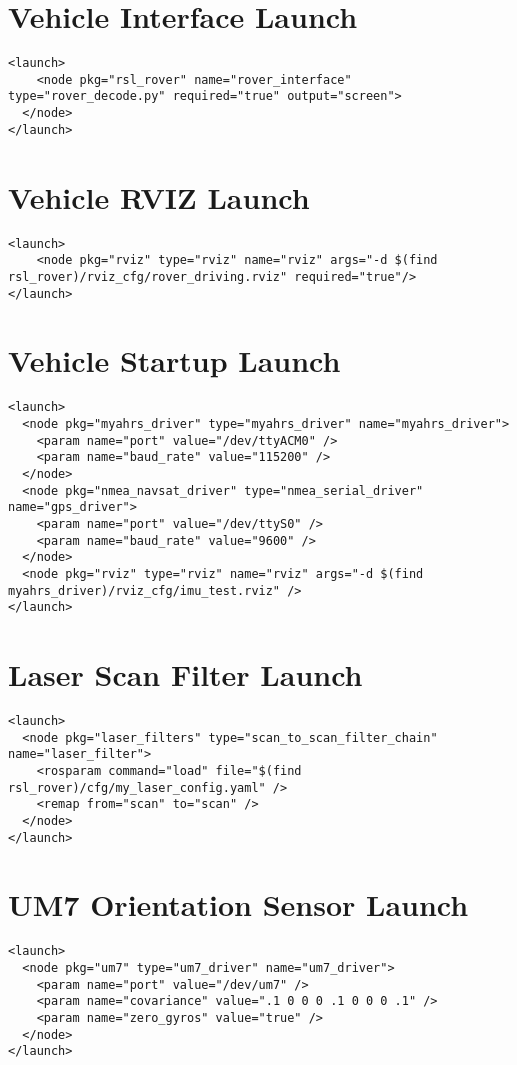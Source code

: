 \section*{Vehicle Interface Launch}
\begin{lstlisting}[breaklines=true,basicstyle=\tiny]
<launch>
	<node pkg="rsl_rover" name="rover_interface" type="rover_decode.py" required="true" output="screen">
  </node>
</launch>
\end{lstlisting}


\section*{Vehicle RVIZ Launch}
\begin{lstlisting}[breaklines=true,basicstyle=\tiny]
<launch>
	<node pkg="rviz" type="rviz" name="rviz" args="-d $(find rsl_rover)/rviz_cfg/rover_driving.rviz" required="true"/>
</launch>
\end{lstlisting}


\section*{Vehicle Startup Launch}
\begin{lstlisting}[breaklines=true,basicstyle=\tiny]
<launch>
  <node pkg="myahrs_driver" type="myahrs_driver" name="myahrs_driver">
    <param name="port" value="/dev/ttyACM0" />
    <param name="baud_rate" value="115200" />
  </node>
  <node pkg="nmea_navsat_driver" type="nmea_serial_driver" name="gps_driver">
    <param name="port" value="/dev/ttyS0" />
    <param name="baud_rate" value="9600" />
  </node>
  <node pkg="rviz" type="rviz" name="rviz" args="-d $(find myahrs_driver)/rviz_cfg/imu_test.rviz" />
</launch>

\end{lstlisting}



\section*{Laser Scan Filter Launch}
\begin{lstlisting}[breaklines=true,basicstyle=\tiny]
<launch>
  <node pkg="laser_filters" type="scan_to_scan_filter_chain"  name="laser_filter">
    <rosparam command="load" file="$(find rsl_rover)/cfg/my_laser_config.yaml" />
    <remap from="scan" to="scan" />
  </node>
</launch>
\end{lstlisting}

\section*{UM7 Orientation Sensor Launch}
\begin{lstlisting}[breaklines=true,basicstyle=\tiny]
<launch>
  <node pkg="um7" type="um7_driver" name="um7_driver">
    <param name="port" value="/dev/um7" />
    <param name="covariance" value=".1 0 0 0 .1 0 0 0 .1" />
    <param name="zero_gyros" value="true" />
  </node>
</launch>
\end{lstlisting}



